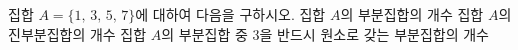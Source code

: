 집합 $A=\{1,\,3,\,5,\,7\}$에 대하여 다음을 구하시오.
 집합 $A$의 부분집합의 개수
 집합 $A$의 진부분집합의 개수
 집합 $A$의 부분집합 중 $3$을 반드시 원소로 갖는 부분집합의 개수

